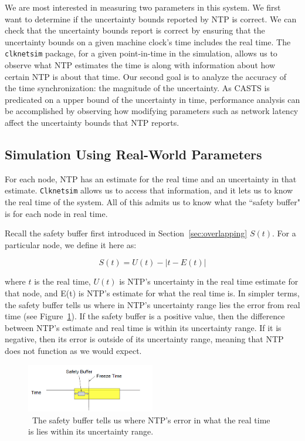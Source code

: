 We are most interested in measuring two parameters in this system. We
first want to determine if the uncertainty bounds reported by NTP is
correct. We can check that the uncertainty bounds report is correct
by ensuring that the uncertainty bounds on a given machine clock's
time includes the real time.  The \texttt{clknetsim} package, for a
given point-in-time in the simulation, allows us to observe what NTP
estimates the time is along with information about how certain NTP is
about that time. Our second goal is to analyze the accuracy of the
time synchronization: the magnitude of the uncertainty.  As 
CASTS is predicated on a upper bound of the uncertainty in time,
performance analysis can be accomplished by observing how modifying
parameters such as network latency affect the uncertainty bounds
that NTP reports.

\subsection{Simulation Using Real-World Parameters}

For each node, NTP has an estimate for the real time and an uncertainty
in that estimate. \texttt{Clknetsim} allows us to access that information, and
it lets us to know the real time of the system. All of this admits
us to know what the ``safety buffer" is for each node in real time.

Recall the safety buffer first introduced in Section~\ref{sec:overlapping} $S(t)$. For a particular node, we define it here as:

\[ S(t) = U(t) - | t - E(t)| \]

where $t$ is the real time, $U(t)$ is NTP's uncertainty in the real
time estimate for that node, and E(t) is NTP's estimate for what the
real time is. In simpler terms, the safety buffer tells us where in NTP's
uncertainty range lies the error from real time (see
Figure~\ref{fig:safety-diag}). If the safety buffer is a positive
value, then the difference between NTP's estimate and real time is
within its uncertainty range. If it is negative, then its error is
outside of its uncertainty range, meaning that NTP does not function as
we would expect.

\begin{figure}[!htbp]
  \centering
  \caption{~The safety buffer tells us where NTP's error in what the real time is lies within its uncertainty range.} 
  \label{fig:safety-diag}
  \includegraphics[width=0.5\textwidth]{safety-diagram.png}
\end{figure}

